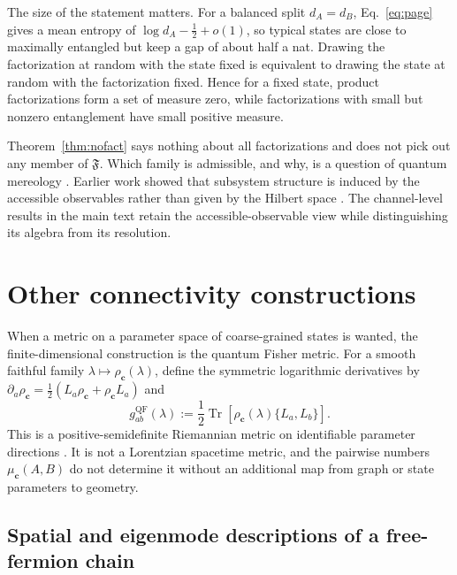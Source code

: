 \documentclass[12pt,a4paper]{article}
\begin{document}
The size of the statement matters. For a balanced split $d_A=d_B$, Eq.~\eqref{eq:page} gives a mean entropy of $\log d_A-\tfrac12+o(1)$, so typical states are close to maximally entangled but keep a gap of about half a nat. Drawing the factorization at random with the state fixed is equivalent to drawing the state at random with the factorization fixed. Hence for a fixed state, product factorizations form a set of measure zero, while factorizations with small but nonzero entanglement have small positive measure.

Theorem~\ref{thm:nofact} says nothing about all factorizations and does not pick out any member of $\mathfrak F$. Which family is admissible, and why, is a question of quantum mereology \cite{Cotler2019,CarrollSingh2021}. Earlier work showed that subsystem structure is induced by the accessible observables rather than given by the Hilbert space \cite{Zanardi2001,Zanardi2004}. The channel-level results in the main text retain the accessible-observable view while distinguishing its algebra from its resolution.

\section{Other connectivity constructions}\label{sec:optional-connectivity}

When a metric on a parameter space of coarse-grained states is wanted, the finite-dimensional construction is the quantum Fisher metric. For a smooth faithful family $\lambda\mapsto\rho_{\mathbf c}(\lambda)$, define the symmetric logarithmic derivatives by $\partial_a\rho_{\mathbf c}=\tfrac12(L_a\rho_{\mathbf c}+\rho_{\mathbf c}L_a)$ and
\begin{equation}
g^{\mathrm{QF}}_{ab}(\lambda)
:=\frac12\operatorname{Tr}\!\left[
\rho_{\mathbf c}(\lambda)\{L_a,L_b\}\right].
\label{eq:qfim}
\end{equation}
This is a positive-semidefinite Riemannian metric on identifiable parameter directions \cite{Petz1996}. It is not a Lorentzian spacetime metric, and the pairwise numbers $\mu_{\mathbf c}(A,B)$ do not determine it without an additional map from graph or state parameters to geometry.

\subsection{Spatial and eigenmode descriptions of a free-fermion chain}
\end{document}
